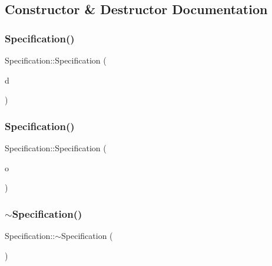 \subsection{Constructor \& Destructor Documentation}
\mbox{\label{structSpecification_acaf5571cd71de67ec6121875dd8190db}} 
\subsubsection{\texorpdfstring{Specification()}{Specification()}\hspace{0.1cm}{\footnotesize\ttfamily [1/2]}}
{\footnotesize\ttfamily Specification\+::\+Specification (\begin{DoxyParamCaption}\item[{\hyperlink{schema_8h_a9804f9d7d7bd63131facb12bbeed41a9}{Schema\+Draft}}]{d }\end{DoxyParamCaption})\hspace{0.3cm}{\ttfamily [inline]}}

\mbox{\label{structSpecification_a2d8d8a8689852cbb28d95d9d669e0381}} 
\subsubsection{\texorpdfstring{Specification()}{Specification()}\hspace{0.1cm}{\footnotesize\ttfamily [2/2]}}
{\footnotesize\ttfamily Specification\+::\+Specification (\begin{DoxyParamCaption}\item[{\hyperlink{schema_8h_adb8b5aa4bb19e8e6920000a9ceebf0cd}{Open\+Api\+Version}}]{o }\end{DoxyParamCaption})\hspace{0.3cm}{\ttfamily [inline]}}

\mbox{\label{structSpecification_a9e5dea83bffde839da128d4551a6a691}} 
\subsubsection{\texorpdfstring{$\sim$\+Specification()}{~Specification()}}
{\footnotesize\ttfamily Specification\+::$\sim$\+Specification (\begin{DoxyParamCaption}{ }\end{DoxyParamCaption})\hspace{0.3cm}{\ttfamily [inline]}}



